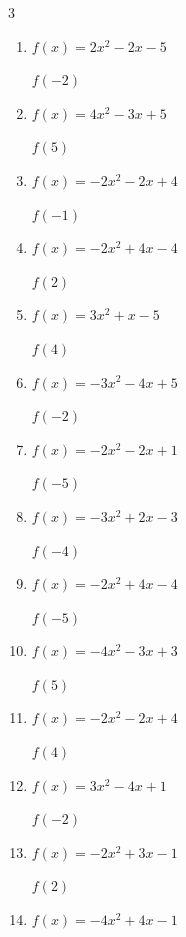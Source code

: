 \begin{multicols}{3}
\begin{enumerate}
$f(-4)$
        \phantom{$= -53$}

  \item $f(x)=2x^{2}-2x-5$

$f(-2)$
        \phantom{$= 7$}

  \item $f(x)=4x^{2}-3x+5$

$f(5)$
        \phantom{$= 90$}

\columnbreak %

  \item $f(x)=-2x^{2}-2x+4$

$f(-1)$
        \phantom{$= 4$}

  \item $f(x)=-2x^{2}+4x-4$

$f(2)$
        \phantom{$= -4$}

  \item $f(x)=3x^{2}+x-5$

$f(4)$
        \phantom{$= 47$}

  \item $f(x)=-3x^{2}-4x+5$

$f(-2)$
        \phantom{$= 1$}

  \item $f(x)=-2x^{2}-2x+1$

$f(-5)$
        \phantom{$= -39$}

  \item $f(x)=-3x^{2}+2x-3$

$f(-4)$
        \phantom{$= -59$}

  \item $f(x)=-2x^{2}+4x-4$

$f(-5)$
        \phantom{$= -74$}

  \item $f(x)=-4x^{2}-3x+3$

$f(5)$
        \phantom{$= -112$}

  \item $f(x)=-2x^{2}-2x+4$

$f(4)$
        \phantom{$= -36$}

  \item $f(x)=3x^{2}-4x+1$

$f(-2)$
        \phantom{$= 21$}

  \item $f(x)=-2x^{2}+3x-1$

$f(2)$
        \phantom{$= -3$}

  \item $f(x)=-4x^{2}+4x-1$


\end{enumerate}
\end{multicols}
